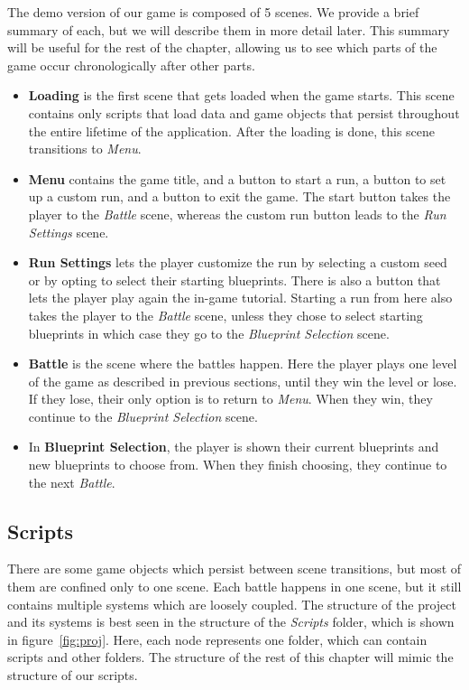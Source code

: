 The demo version of our game is composed of 5 scenes.
We provide a brief summary of each, but we will describe them in more detail later.
This summary will be useful for the rest of the chapter, allowing us to see which parts of the game occur chronologically after other parts.
\begin{itemize}
    \item \textbf{Loading} is the first scene that gets loaded when the game starts.
          This scene contains only scripts that load data and game objects that persist throughout the entire lifetime of the application.
          After the loading is done, this scene transitions to \emph{Menu}.
    \item \textbf{Menu} contains the game title, and a button to start a run, a button to set up a custom run, and a button to exit the game.
          The start button takes the player to the \emph{Battle} scene, whereas the custom run button leads to the \emph{Run Settings} scene.
    \item \textbf{Run Settings} lets the player customize the run by selecting a custom seed or by opting to select their starting blueprints.
          There is also a button that lets the player play again the in-game tutorial.
          Starting a run from here also takes the player to the \emph{Battle} scene, unless they chose to select starting blueprints in which case they go to the \emph{Blueprint Selection} scene.
    \item \textbf{Battle} is the scene where the battles happen.
          Here the player plays one level of the game as described in previous sections, until they win the level or lose.
          If they lose, their only option is to return to \emph{Menu}.
          When they win, they continue to the \emph{Blueprint Selection} scene.
    \item In \textbf{Blueprint Selection}, the player is shown their current blueprints and new blueprints to choose from.
          When they finish choosing, they continue to the next \emph{Battle}.
\end{itemize}

\subsection{Scripts}

There are some game objects which persist between scene transitions, but most of them are confined only to one scene.
Each battle happens in one scene, but it still contains multiple systems which are loosely coupled.
The structure of the project and its systems is best seen in the structure of the \emph{Scripts} folder, which is shown in figure~\ref{fig:proj}.
Here, each node represents one folder, which can contain scripts and other folders.
The structure of the rest of this chapter will mimic the structure of our scripts.

